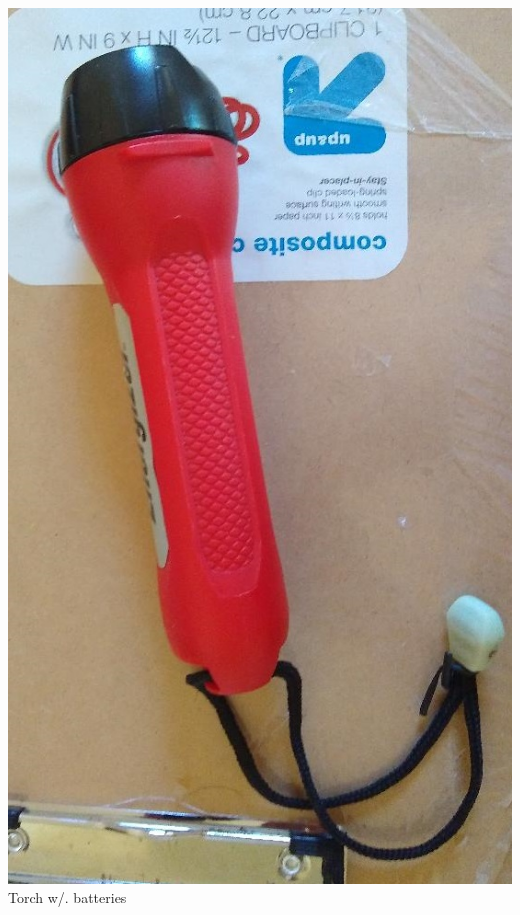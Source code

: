 \documentclass[t]{beamer}
\newcommand{\htarget}[2]{\hypertarget{#1}{#2}}
\begin{document}
\begin{frame}\htarget{torch}{} \begin{center}
\includegraphics[height=0.8\textheight]{torch_mini.jpg} \\
Torch w/. batteries
\end{center} \end{frame}
\end{document}
